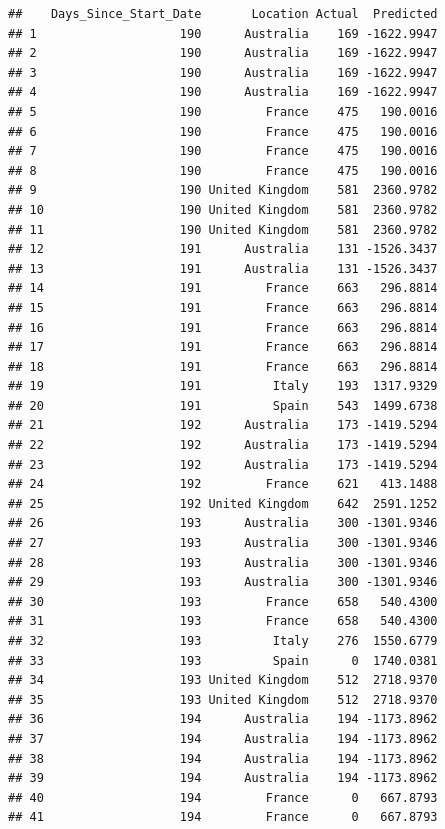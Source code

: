 \documentclass[
]{article}
\begin{document}
\begin{verbatim}
##    Days_Since_Start_Date       Location Actual  Predicted
## 1                    190      Australia    169 -1622.9947
## 2                    190      Australia    169 -1622.9947
## 3                    190      Australia    169 -1622.9947
## 4                    190      Australia    169 -1622.9947
## 5                    190         France    475   190.0016
## 6                    190         France    475   190.0016
## 7                    190         France    475   190.0016
## 8                    190         France    475   190.0016
## 9                    190 United Kingdom    581  2360.9782
## 10                   190 United Kingdom    581  2360.9782
## 11                   190 United Kingdom    581  2360.9782
## 12                   191      Australia    131 -1526.3437
## 13                   191      Australia    131 -1526.3437
## 14                   191         France    663   296.8814
## 15                   191         France    663   296.8814
## 16                   191         France    663   296.8814
## 17                   191         France    663   296.8814
## 18                   191         France    663   296.8814
## 19                   191          Italy    193  1317.9329
## 20                   191          Spain    543  1499.6738
## 21                   192      Australia    173 -1419.5294
## 22                   192      Australia    173 -1419.5294
## 23                   192      Australia    173 -1419.5294
## 24                   192         France    621   413.1488
## 25                   192 United Kingdom    642  2591.1252
## 26                   193      Australia    300 -1301.9346
## 27                   193      Australia    300 -1301.9346
## 28                   193      Australia    300 -1301.9346
## 29                   193      Australia    300 -1301.9346
## 30                   193         France    658   540.4300
## 31                   193         France    658   540.4300
## 32                   193          Italy    276  1550.6779
## 33                   193          Spain      0  1740.0381
## 34                   193 United Kingdom    512  2718.9370
## 35                   193 United Kingdom    512  2718.9370
## 36                   194      Australia    194 -1173.8962
## 37                   194      Australia    194 -1173.8962
## 38                   194      Australia    194 -1173.8962
## 39                   194      Australia    194 -1173.8962
## 40                   194         France      0   667.8793
## 41                   194         France      0   667.8793

\end{verbatim}
\end{document}
